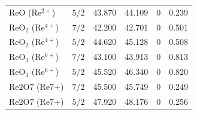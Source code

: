 \documentclass[12pt]{article}
\begin{document}
\begin{table}[H]
\begin{threeparttable}
\begin{tabular}{llrrrr}
$\mathrm{ReO}$ ($\mathrm{Re^{2+}}$) & $5/2$ & 43.870 & 44.109 & 0 & 0.239 \\
$\mathrm{ReO_2}$ ($\mathrm{Re^{4+}}$) & $7/2$ & 42.200 & 42.701 & 0 & 0.501 \\
$\mathrm{ReO_2}$ ($\mathrm{Re^{4+}}$) & $5/2$ & 44.620 & 45.128 & 0 & 0.508 \\
$\mathrm{ReO_3}$ ($\mathrm{Re^{6+}}$) & $7/2$ & 43.100 & 43.913 & 0 & 0.813 \\
$\mathrm{ReO_3}$ ($\mathrm{Re^{6+}}$) & $5/2$ & 45.520 & 46.340 & 0 & 0.820 \\
Re2O7 (Re7+) & $7/2$ & 45.500 & 45.749 & 0 & 0.249 \\
Re2O7 (Re7+) & $5/2$ & 47.920 & 48.176 & 0 & 0.256 \\
\bottomrule
\end{tabular}
\end{threeparttable}
\end{table}
\end{document}
